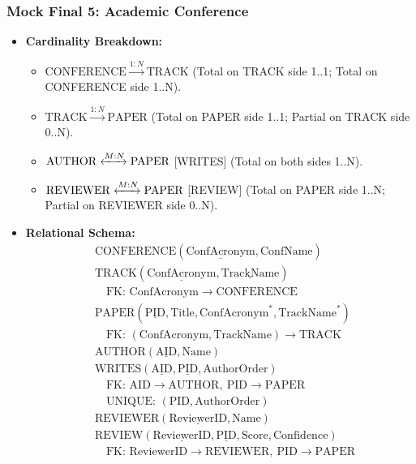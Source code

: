 \documentclass[10pt,a4paper]{article}
\begin{document}
\subsubsection*{Mock Final 5: Academic Conference}
\begin{itemize}
  \item \textbf{Cardinality Breakdown:}
  \begin{itemize}
    \item $\mathrm{CONFERENCE} \xrightarrow{1:N} \mathrm{TRACK}$ (Total on TRACK side 1..1; Total on CONFERENCE side 1..N).
    \item $\mathrm{TRACK} \xrightarrow{1:N} \mathrm{PAPER}$ (Total on PAPER side 1..1; Partial on TRACK side 0..N).
    \item $\mathrm{AUTHOR} \xleftrightarrow{M:N} \mathrm{PAPER}$ [WRITES] (Total on both sides 1..N).
    \item $\mathrm{REVIEWER} \xleftrightarrow{M:N} \mathrm{PAPER}$ [REVIEW] (Total on PAPER side 1..N; Partial on REVIEWER side 0..N).
  \end{itemize}
  \item \textbf{Relational Schema:}
  \begin{align*}
    &\mathrm{CONFERENCE}(\underline{\mathrm{ConfAcronym}}, \mathrm{ConfName})\\
    &\mathrm{TRACK}(\underline{\mathrm{ConfAcronym}}, \underline{\mathrm{TrackName}})\\
    &\quad \text{FK: } \mathrm{ConfAcronym} \to \mathrm{CONFERENCE}\\
    &\mathrm{PAPER}(\underline{\mathrm{PID}}, \mathrm{Title}, \mathrm{ConfAcronym}^*, \mathrm{TrackName}^*)\\
    &\quad \text{FK: } (\mathrm{ConfAcronym}, \mathrm{TrackName}) \to \mathrm{TRACK}\\
    &\mathrm{AUTHOR}(\underline{\mathrm{AID}}, \mathrm{Name})\\
    &\mathrm{WRITES}(\underline{\mathrm{AID}}, \underline{\mathrm{PID}}, \mathrm{AuthorOrder})\\
    &\quad \text{FK: } \mathrm{AID} \to \mathrm{AUTHOR},\ \mathrm{PID} \to \mathrm{PAPER}\\
    &\quad \text{UNIQUE: } (\mathrm{PID}, \mathrm{AuthorOrder})\\
    &\mathrm{REVIEWER}(\underline{\mathrm{ReviewerID}}, \mathrm{Name})\\
    &\mathrm{REVIEW}(\underline{\mathrm{ReviewerID}}, \underline{\mathrm{PID}}, \mathrm{Score}, \mathrm{Confidence})\\
    &\quad \text{FK: } \mathrm{ReviewerID} \to \mathrm{REVIEWER},\ \mathrm{PID} \to \mathrm{PAPER}
  \end{align*}
\end{itemize}
\end{document}
